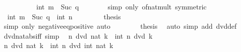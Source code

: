 \begin{isabellebody}
\ \ \ \ \isamarkupfalse%
\ \isamarkupfalse%
\ {\isachardoublequoteopen}{\isasymdots}\ {\isacharequal}{\kern0pt}\ {\isacharminus}{\kern0pt}\ int\ {\isacharparenleft}{\kern0pt}m\ {\isacharasterisk}{\kern0pt}\ Suc\ q{\isacharparenright}{\kern0pt}{\isachardoublequoteclose}\isanewline
\ \ \ \ \ \ \isamarkupfalse%
\ {\isacharparenleft}{\kern0pt}simp\ only{\isacharcolon}{\kern0pt}\ of{\isacharunderscore}{\kern0pt}nat{\isacharunderscore}{\kern0pt}mult\ {\isacharbrackleft}{\kern0pt}symmetric{\isacharbrackright}{\kern0pt}{\isacharparenright}{\kern0pt}\isanewline
\ \ \ \ \isamarkupfalse%
\ \isamarkupfalse%
\ {\isachardoublequoteopen}{\isacharminus}{\kern0pt}\ int\ {\isacharparenleft}{\kern0pt}m\ {\isacharasterisk}{\kern0pt}\ Suc\ q{\isacharparenright}{\kern0pt}\ {\isacharequal}{\kern0pt}\ int\ n{\isachardoublequoteclose}\ \isacommand{{\isachardot}{\kern0pt}{\isachardot}{\kern0pt}}\isamarkupfalse%
\isanewline
\ \ \ \ \isamarkupfalse%
\ \isamarkupfalse%
\ {\isacharquery}{\kern0pt}thesis\isanewline
\ \ \ \ \ \ \isamarkupfalse%
\ {\isacharparenleft}{\kern0pt}simp\ only{\isacharcolon}{\kern0pt}\ negative{\isacharunderscore}{\kern0pt}eq{\isacharunderscore}{\kern0pt}positive{\isacharparenright}{\kern0pt}\ auto\isanewline
\ \ \isamarkupfalse%
\isanewline
\ \ \isamarkupfalse%
\ \isamarkupfalse%
\ {\isacharquery}{\kern0pt}thesis\ \isamarkupfalse%
\ {\isacharparenleft}{\kern0pt}auto\ simp\ add{\isacharcolon}{\kern0pt}\ dvd{\isacharunderscore}{\kern0pt}def{\isacharparenright}{\kern0pt}\isanewline
{}\isamarkupfalse%
%
\endisatagproof
{\isafoldproof}%
%
\isadelimproof
\isanewline
%
\endisadelimproof
\isanewline
{}\isamarkupfalse%
\ dvd{\isacharunderscore}{\kern0pt}nat{\isacharunderscore}{\kern0pt}abs{\isacharunderscore}{\kern0pt}iff\ {\isacharbrackleft}{\kern0pt}simp{\isacharbrackright}{\kern0pt}{\isacharcolon}{\kern0pt}\isanewline
\ \ {\isachardoublequoteopen}n\ dvd\ nat\ {\isasymbar}k{\isasymbar}\ {\isasymlongleftrightarrow}\ int\ n\ dvd\ k{\isachardoublequoteclose}\isanewline
%
\isadelimproof
%
\endisadelimproof
%
\isatagproof
{}\isamarkupfalse%
\ {\isacharminus}{\kern0pt}\isanewline
\ \ \isamarkupfalse%
\ {\isachardoublequoteopen}n\ dvd\ nat\ {\isasymbar}k{\isasymbar}\ {\isasymlongleftrightarrow}\ int\ n\ dvd\ int\ {\isacharparenleft}{\kern0pt}nat\ {\isasymbar}k{\isasymbar}{\isacharparenright}{\kern0pt}{\isachardoublequoteclose}\isanewline

\end{isabellebody}
